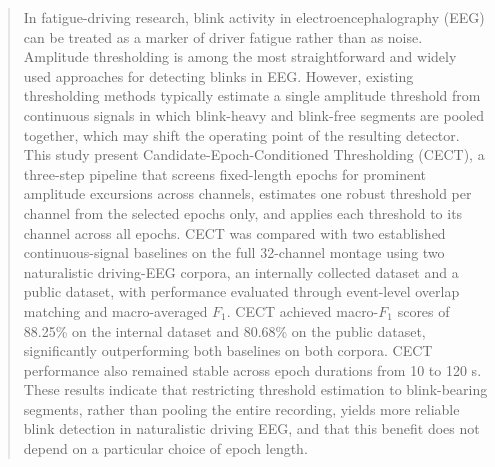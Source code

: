 \begin{abstract}
    In fatigue-driving research, blink activity in electroencephalography (EEG) can be treated as a marker of driver fatigue rather than as noise. Amplitude thresholding is among the most straightforward and widely used approaches for detecting blinks in EEG.
However, existing thresholding methods typically estimate a single amplitude threshold from continuous signals in which blink-heavy and blink-free segments are pooled together, which may shift the operating point of the resulting detector. This study  present Candidate-Epoch-Conditioned Thresholding (CECT), a three-step pipeline that screens fixed-length epochs for prominent amplitude excursions across channels, estimates one robust threshold per channel from the selected epochs only, and applies each threshold to its channel across all epochs.
CECT was compared with two established continuous-signal baselines on the full 32-channel montage using two naturalistic driving-EEG corpora, an internally collected dataset and a public dataset, with performance evaluated through event-level overlap matching and macro-averaged $F_1$.
CECT achieved macro-$F_1$ scores of 88.25\% on the internal dataset and 80.68\% on the public dataset, significantly outperforming both baselines on both corpora. CECT performance also remained stable across epoch durations from 10 to 120 s. These results indicate that restricting threshold estimation to blink-bearing segments, rather than pooling the entire recording, yields more reliable blink detection in naturalistic driving EEG, and that this benefit does not depend on a particular choice of epoch length.
\end{abstract}
